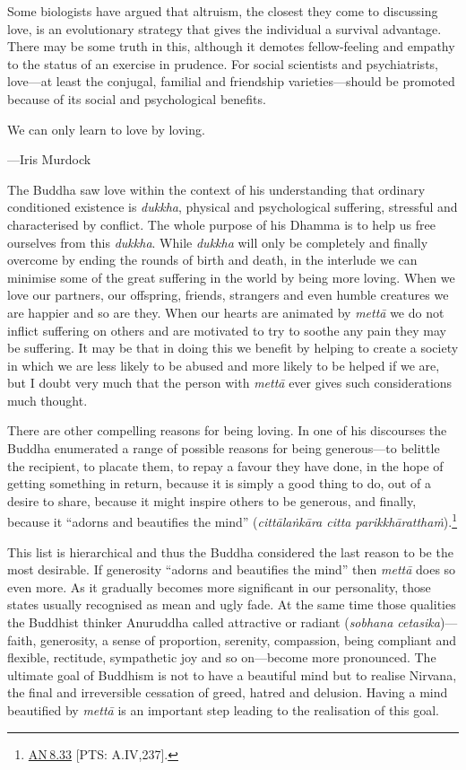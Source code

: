 \documentclass[10pt, openright]{book}
\newenvironment{epigram-2}%
{%
\setstretch{1.4}
\vspace{1em}
\noindent
\quoting[leftmargin=2cm,rightmargin=2cm]%
\begin{itshape}
\large
}%
{\end{itshape}\endquoting
}%
\newenvironment{epigram-2-cite}%
{%
\quoting[leftmargin=2cm,rightmargin=2cm]%
\noindent\normal\hspace*{\fill} 
}%
{\endquoting
}%
\begin{document}
Some biologists have argued that altruism, the closest they come to discussing love, is an evolutionary strategy that gives the individual a survival advantage. There may be some truth in this, although it demotes fellow-feeling and empathy to the status of an exercise in prudence. For social scientists and psychiatrists, love—at least the conjugal, familial and friendship varieties—should be promoted because of its social and psychological benefits.


\begin{epigram-2}
We can only learn to love by loving.
\end{epigram-2}
\begin{epigram-2-cite}
—Iris Murdock
\end{epigram-2-cite}

The Buddha saw love within the context of his understanding that ordinary conditioned existence is \textit{dukkha}, physical and psychological suffering, stressful and characterised by conflict. The whole purpose of his Dhamma is to help us free ourselves from this \textit{dukkha}. While \textit{dukkha} will only be completely and finally overcome by ending the rounds of birth and death, in the interlude we can minimise some of the great suffering in the world by being more loving. When we love our partners, our offspring, friends, strangers and even humble creatures we are happier and so are they. When our hearts are animated by \textit{mettā} we do not inflict suffering on others and are motivated to try to soothe any pain they may be suffering. It may be that in doing this we benefit by helping to create a society in which we are less likely to be abused and more likely to be helped if we are, but I doubt very much that the person with \textit{mettā} ever gives such considerations much thought.


There are other compelling reasons for being loving. In one of his discourses the Buddha enumerated a range of possible reasons for being generous—to belittle the recipient, to placate them, to repay a favour they have done, in the hope of getting something in return, because it is simply a good thing to do, out of a desire to share, because it might inspire others to be generous, and finally, because it “adorns and beautifies the mind” (\textit{cittālaṅkāra citta parikkhāratthaṁ}).\footnote {\href{https://suttacentral.net/an8.33/en/sujato}{AN 8.33} [PTS: A.IV,237].}


This list is hierarchical and thus the Buddha considered the last reason to be the most desirable. If generosity “adorns and beautifies the mind” then \textit{mettā} does so even more. As it gradually becomes more significant in our personality, those states usually recognised as mean and ugly fade. At the same time those qualities the Buddhist thinker Anuruddha called attractive or radiant (\textit{sobhana cetasika})—faith, generosity, a sense of proportion, serenity, compassion, being compliant and flexible, rectitude, sympathetic joy and so on—become more pronounced. The ultimate goal of Buddhism is not to have a beautiful mind but to realise Nirvana, the final and irreversible cessation of greed, hatred and delusion. Having a mind beautified by \textit{mettā} is an important step leading to the realisation of this goal.
\end{document}
